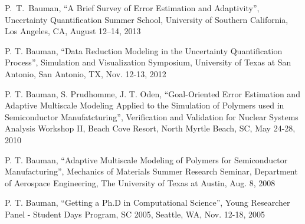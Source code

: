 P.~T.~Bauman,
``A Brief Survey of Error Estimation and Adaptivity'',
Uncertainty Quantification Summer School,
University of Southern California, Los Angeles, CA, August 12--14, 2013


P. T. Bauman,
``Data Reduction Modeling in the Uncertainty Quantification Process'',
Simulation and Visualization Symposium, University of Texas at San Antonio, San Antonio, TX, Nov. 12-13, 2012

\blankline

P. T. Bauman, S. Prudhomme, J. T. Oden,
``Goal-Oriented Error Estimation and Adaptive Multiscale Modeling Applied to the Simulation of Polymers used in Semiconductor Manufatcturing'',
Verification and Validation for Nuclear Systems Analysis Workshop II,
Beach Cove Resort, North Myrtle Beach, SC, May 24-28, 2010

\blankline

P. T. Bauman,
``Adaptive Multiscale Modeling of Polymers for Semiconductor Manufacturing'',
Mechanics of Materials Summer Research Seminar,
Department of Aerospace Engineering, The University of Texas at Austin, Aug. 8, 2008

\blankline

P. T. Bauman,
``Getting a Ph.D in Computational Science'',
Young Researcher Panel - Student Days Program, SC 2005, Seattle, WA, Nov. 12-18, 2005 
